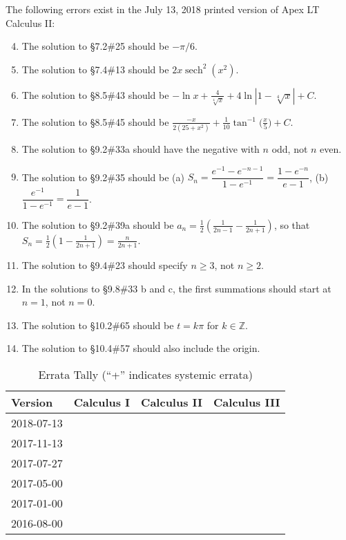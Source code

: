 \documentclass{amsart}
\makeatletter
\newcommand{\ds}{\displaystyle}
\newcommand{\abs}[1]{\left\lvert#1\right\rvert}
\DeclareMathOperator{\sech}{sech}
\newcommand{\errorcount}[1]{%
 \@ifundefined{r@#1plus}{%
  \@ifundefined{r@#1}{%
  }{%
   \makebox[2em][r]{\ref{#1}\phantom{+}}
  }
 }{%
  \makebox[2em][r]{\ref{#1plus}+}
 }
}
\newcommand{\errorrow}[1]{%
 #1 & \errorcount{#1I} & \errorcount{#1II} & \errorcount{#1III}
}
\makeatother
\begin{document}
The following errors exist in the July 13, 2018 printed version of Apex LT Calculus II:
\begin{enumerate}\setcounter{enumi}{3}
\item The solution to \S7.2\#25 should be $-\pi/6$.
\item The solution to \S7.4\#13 should be $2x\sech^2(x^2)$.
\item The solution to \S8.5\#43 should be $\ds-\ln x+\frac4{\sqrt[4]{x}}+4\ln\abs{1-\sqrt[4]{x}}+C$.
\item The solution to \S8.5\#45 should be $\ds\frac{-x}{2(25+x^2)}+\frac1{10}\tan^{-1}\bigl(\frac x5\bigr)+C$.
\item The solution to \S9.2\#33a should have the negative with $n$ odd, not $n$ even.
\item The solution to \S9.2\#35 should be (a) $S_n=\dfrac{e^{-1}-e^{-n-1}}{1-e^{-1}}=\dfrac{1-e^{-n}}{e-1}$, (b) $\dfrac{e^{-1}}{1-e^{-1}}=\dfrac1{e-1}$.
\item The solution to \S9.2\#39a should be $a_n = \frac12\left(\frac{1}{2n-1}-\frac{1}{2n+1}\right)$, so that $S_n=\frac12\left(1-\frac1{2n+1}\right) = \frac{n}{2n+1}$.
\item The solution to \S9.4\#23 should specify $n\ge3$, not $n\ge2$.
\item In the solutions to \S9.8\#33 b and c, the first summations should start at $n=1$, not $n=0$.
\item The solution to \S10.2\#65 should be $t=k\pi$ for $k\in\mathbb{Z}$.
\item The solution to \S10.4\#57 should also include the origin.
\label{2018-07-13II}
\end{enumerate}\vspace{.5in}

\begin{table}[h]
\begin{tabular}{lccc}\toprule
Version & Calculus I & Calculus II & Calculus III \\\midrule
\errorrow{2018-07-13} \\
\errorrow{2017-11-13} \\
\errorrow{2017-07-27} \\
\errorrow{2017-05-00} \\
\errorrow{2017-01-00} \\
\errorrow{2016-08-00} \\
\bottomrule
\end{tabular}
\caption{Errata Tally (``+'' indicates systemic errata)}
\end{table}
\end{document}
